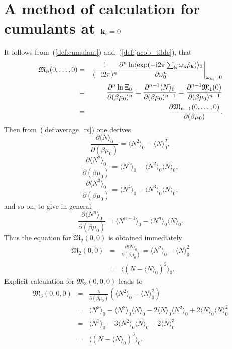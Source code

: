 \section{\label{app:cumulant_calc_k_0}A method of calculation for cumulants at $\vb k_i = 0$}
It follows from~(\ref{def:cumulant}) and~(\ref{def:jacob_tilde}), that 
\begin{eqnarray}
	\mathfrak{M}_n(0, \dotsc, 0) &=& \frac{1}{(-{\rm i}2\pi)^n} \frac{\partial^n \ln \langle\exp(-{\rm i}2\pi \sum_{\vb k} \omega_{\vb k}\hat{\rho}_{\vb k}) \rangle_0}
	{\partial\omega_0^n} \bigg|_{\omega_{\vb k_i} = 0}
	\nonumber\\
	&=& \frac{\partial^n \ln \Xi_0}{\partial(\beta\mu_0)^n} 
	= \frac{\partial^{n-1}\langle N \rangle_0}{\partial(\beta\mu_0)^{n-1}} 
	= \frac{\partial^{n-1}\mathfrak{M}_1(0)}{\partial(\beta\mu_0)^{n-1}}
	\nonumber\\
	&=& \frac{\partial\mathfrak{M}_{n-1}(0,\dotsc,0)}{\partial(\beta\mu_0)}.
\end{eqnarray}
Then from~(\ref{def:average_rs}) one derives
\begin{equation}
	\frac{\partial \langle N \rangle_0}{\partial(\beta\mu_0)} = \langle N^2 \rangle_0 - \langle N \rangle_0^2,
\end{equation}
\begin{equation}
	\frac{\partial \langle N^2 \rangle_0}{\partial(\beta\mu_0)} = \langle N^3 \rangle_0 - \langle N^2 \rangle_0\langle N \rangle_0,
\end{equation}
\begin{equation}
	\frac{\partial \langle N^3 \rangle_0}{\partial(\beta\mu_0)} = \langle N^4 \rangle_0 - \langle N^3 \rangle_0\langle N \rangle_0,
\end{equation}
and so on, to give in general:
\begin{equation}
	\frac{\partial \langle N^n \rangle_0}{\partial(\beta\mu_0)} = \langle N^{n+1} \rangle_0 - \langle N^n \rangle_0\langle N \rangle_0.
\end{equation}
Thus the equation for $\mathfrak{M}_2(0,0)$ is obtained immediately
\begin{eqnarray}
	\mathfrak{M}_2(0,0) &=& \frac{\partial \langle N \rangle_0}{\partial(\beta\mu_0)} = \langle N^2 \rangle_0 - \langle N \rangle_0^2 
	\nonumber\\
	&=& \langle (N - \langle N \rangle_0)^2 \rangle_0. 
\end{eqnarray}
Explicit calculation for $\mathfrak{M}_3(0,0,0)$ leads to
\begin{eqnarray}
	\mathfrak{M}_3(0,0,0) &=& \frac{\partial}{\partial(\beta\mu_0)}\left(\langle N^2 \rangle_0 - \langle N \rangle_0^2\right) 
	\nonumber\\
	&=& \langle N^3 \rangle_0 - \langle N^2 \rangle_0\langle N \rangle_0 - 2\langle N \rangle_0\langle N^2 \rangle_0 + 2\langle N \rangle_0\langle N \rangle_0^2
	\nonumber\\
	&=& \langle N^3 \rangle_0 -3 \langle N^2 \rangle_0\langle N \rangle_0 + 2\langle N \rangle_0^3
	\nonumber\\
	&=& \langle (N - \langle N \rangle_0)^3 \rangle_0.
\end{eqnarray}
